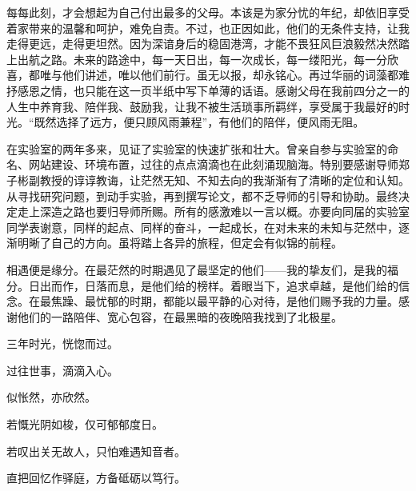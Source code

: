 \documentclass{sysuthesis} %
\numberwithin{algorithm}{chapter}
\theoremstyle{plain}
\theoremstyle{definition}
\theoremstyle{definition}
\begin{document}
\begin{Acknowledgement}
每每此刻，才会想起为自己付出最多的父母。本该是为家分忧的年纪，却依旧享受着家带来的温馨和呵护，难免自责。不过，也正因如此，他们的无条件支持，让我走得更远，走得更坦然。因为深谙身后的稳固港湾，才能不畏狂风巨浪毅然决然踏上出航之路。未来的路途中，每一天日出，每一次成长，每一缕阳光，每一分欣喜，都唯与他们讲述，唯以他们前行。虽无以报，却永铭心。再过华丽的词藻都难抒感恩之情，也只能在这一页半纸中写下单薄的话语。感谢父母在我前四分之一的人生中养育我、陪伴我、鼓励我，让我不被生活琐事所羁绊，享受属于我最好的时光。“既然选择了远方，便只顾风雨兼程”，有他们的陪伴，便风雨无阻。

在实验室的两年多来，见证了实验室的快速扩张和壮大。曾亲自参与实验室的命名、网站建设、环境布置，过往的点点滴滴也在此刻涌现脑海。特别要感谢导师郑子彬副教授的谆谆教诲，让茫然无知、不知去向的我渐渐有了清晰的定位和认知。从寻找研究问题，到动手实验，再到撰写论文，都不乏导师的引导和协助。最终决定走上深造之路也要归导师所赐。所有的感激难以一言以概。亦要向同届的实验室同学表谢意，同样的起点、同样的奋斗，一起成长，在对未来的未知与茫然中，逐渐明晰了自己的方向。虽将踏上各异的旅程，但定会有似锦的前程。

相遇便是缘分。在最茫然的时期遇见了最坚定的他们——我的挚友们，是我的福分。日出而作，日落而息，是他们给的榜样。着眼当下，追求卓越，是他们给的信念。在最焦躁、最忧郁的时期，都能以最平静的心对待，是他们赐予我的力量。感谢他们的一路陪伴、宽心包容，在最黑暗的夜晚陪我找到了北极星。


\vspace{6pt}

\begin{center}
三年时光，恍惚而过。

过往世事，滴滴入心。

似怅然，亦欣然。

若慨光阴如梭，仅可郁郁度日。

若叹出关无故人，只怕难遇知音者。

直把回忆作驿庭，方备砥砺以笃行。
\end{center}
\end{Acknowledgement}
\end{document}
